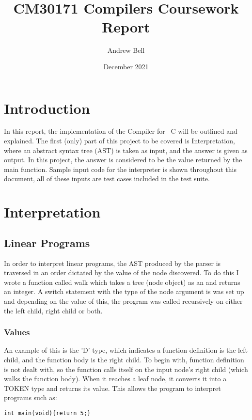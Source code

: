 \documentclass[11pt]{article}
\author{Andrew Bell}
\title{CM30171 Compilers Coursework Report}
\date{December 2021}
\begin{document}
\maketitle
\tableofcontents

\section{Introduction}

In this report, the implementation of the Compiler for --C will be outlined and explained. The first (only) part of this project to be covered is Interpretation, where an abstract syntax tree (AST) is taken as input, and the answer is given as output. In this project, the answer is considered to be the value returned by the main function. Sample input code for the interpreter is shown throughout this document, all of these inputs are test cases included in the test suite.

\section{Interpretation}

\subsection{Linear Programs}

In order to interpret linear programs, the AST produced by the parser is traversed in an order dictated by the value of the node discovered. To do this I wrote a function called walk which takes a tree (node object) as an and returns an integer. A switch statement with the type of the node argument is was set up and depending on the value of this, the program was called recursively on either the left child, right child or both. 

\subsubsection{Values}

An example of this is the 'D' type, which indicates a function definition is the left child, and the function body is the right child. To begin with, function definition is not dealt with, so the function calls itself on the input node's right child (which walks the function body). When it reaches a leaf node, it converts it into a TOKEN type and returns its value. This allows the program to interpret programs such as:
\begin{lstlisting}
int main(void){return 5;}
\end{lstlisting}
\end{document}
